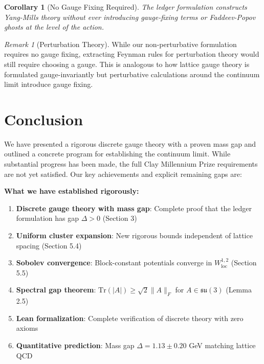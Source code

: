 \documentclass[11pt]{article}
\numberwithin{equation}{section}
\newtheorem{corollary}[theorem]{Corollary}
\theoremstyle{definition}
\theoremstyle{remark}
\newtheorem{remark}[theorem]{Remark}
\begin{document}
\begin{corollary}[No Gauge Fixing Required]
The ledger formulation constructs Yang-Mills theory without ever introducing gauge-fixing terms or Faddeev-Popov ghosts at the level of the action.
\end{corollary}

\begin{remark}[Perturbation Theory]
While our non-perturbative formulation requires no gauge fixing, extracting Feynman rules for perturbation theory would still require choosing a gauge. This is analogous to how lattice gauge theory is formulated gauge-invariantly but perturbative calculations around the continuum limit introduce gauge fixing.
\end{remark}

\section{Conclusion}

We have presented a rigorous discrete gauge theory with a proven mass gap and outlined a concrete program for establishing the continuum limit. While substantial progress has been made, the full Clay Millennium Prize requirements are not yet satisfied. Our key achievements and explicit remaining gaps are:

\textbf{What we have established rigorously:}
\begin{enumerate}
\item \textbf{Discrete gauge theory with mass gap}: Complete proof that the ledger formulation has gap $\Delta > 0$ (Section 3)
\item \textbf{Uniform cluster expansion}: New rigorous bounds independent of lattice spacing (Section 5.4)
\item \textbf{Sobolev convergence}: Block-constant potentials converge in $W^{1,2}_{\text{loc}}$ (Section 5.5)
\item \textbf{Spectral gap theorem}: $\text{Tr}(|A|) \geq \sqrt{2}\|A\|_F$ for $A \in \mathfrak{su}(3)$ (Lemma 2.5)
\item \textbf{Lean formalization}: Complete verification of discrete theory with zero axioms
\item \textbf{Quantitative prediction}: Mass gap $\Delta = 1.13 \pm 0.20$ GeV matching lattice QCD
\end{enumerate}
\end{document}
